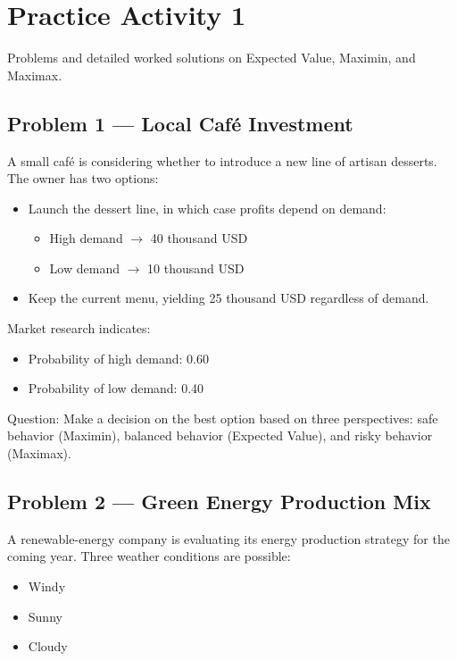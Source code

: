 \section{Practice Activity 1}\label{sec:practice-activity-1}

Problems and detailed worked solutions on Expected Value, Maximin, and Maximax.

\subsection{Problem 1 --- Local Café Investment}\label{subsec:practice-activity-1-problem-1}

A small café is considering whether to introduce a new line of artisan desserts.
The owner has two options:

\begin{itemize}
	\item Launch the dessert line, in which case profits depend on demand:
	\begin{itemize}
		\item High demand \(\rightarrow\) 40 thousand USD
		\item Low demand \(\rightarrow\) 10 thousand USD
	\end{itemize}
	\item Keep the current menu, yielding 25 thousand USD regardless of demand.
\end{itemize}

Market research indicates:

\begin{itemize}
	\item Probability of high demand: 0.60
	\item Probability of low demand: 0.40
\end{itemize}

Question: Make a decision on the best option based on three perspectives: safe behavior (Maximin), balanced behavior (Expected Value), and risky behavior (Maximax).

\subsection{Problem 2 --- Green Energy Production Mix}\label{subsec:practice-activity-1-problem-2}

A renewable-energy company is evaluating its energy production strategy for the coming year.
Three weather conditions are possible:

\begin{itemize}
	\item Windy
	\item Sunny
	\item Cloudy
\end{itemize}

